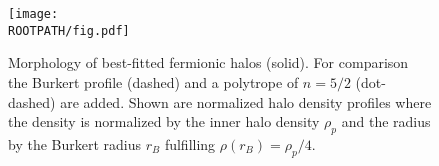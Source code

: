 \begin{figure}%
	\centering%
	\texttt{[image: \\ROOTPATH/fig.pdf]}%
	\caption{Morphology of best-fitted fermionic halos (solid). For comparison the Burkert profile (dashed) and a polytrope of $n=5/2$ (dot-dashed) are added. Shown are normalized halo density profiles where the density is normalized by the inner halo density $\rho_p$ and the radius by the Burkert radius $r_B$ fulfilling $\rho(r_B) = \rho_p/4$.}%
\label{fig:halo-profiles}
\end{figure}